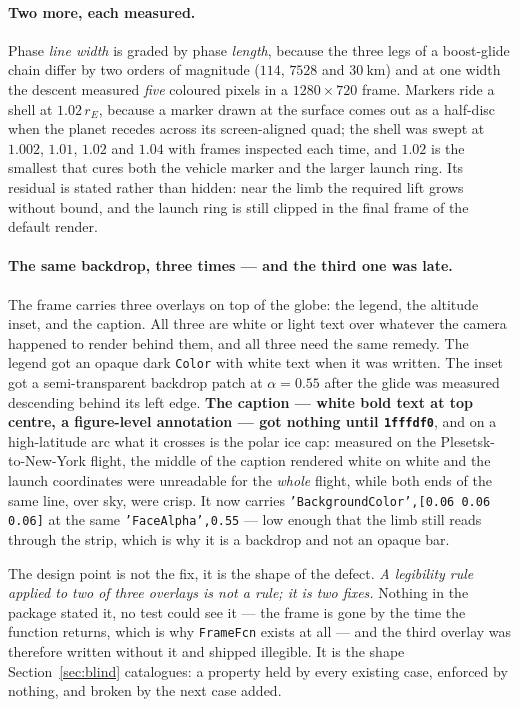 \documentclass[11pt]{article}
\newcommand{\code}[1]{\texttt{#1}}
\begin{document}
\paragraph{Two more, each measured.} Phase \emph{line width} is graded by phase
\emph{length}, because the three legs of a boost-glide chain differ by two
orders of magnitude ($114$, $7528$ and $30~\mathrm{km}$) and at one width the
descent measured \emph{five} coloured pixels in a $1280\times720$ frame.
Markers ride a shell at $1.02\,r_E$, because a marker drawn at the surface
comes out as a half-disc when the planet recedes across its screen-aligned
quad; the shell was swept at $1.002$, $1.01$, $1.02$ and $1.04$ with frames
inspected each time, and $1.02$ is the smallest that cures both the vehicle
marker and the larger launch ring. Its residual is stated rather than hidden:
near the limb the required lift grows without bound, and the launch ring is
still clipped in the final frame of the default render.

\paragraph{The same backdrop, three times --- and the third one was late.} The
frame carries three overlays on top of the globe: the legend, the altitude
inset, and the caption. All three are white or light text over whatever the
camera happened to render behind them, and all three need the same remedy. The
legend got an opaque dark \code{Color} with white text when it was written. The
inset got a semi-transparent backdrop patch at $\alpha = 0.55$ after the glide
was measured descending behind its left edge. \textbf{The caption --- white bold
text at top centre, a figure-level annotation --- got nothing until
\code{1fffdf0}}, and on a high-latitude arc what it crosses is the polar ice
cap: measured on the Plesetsk-to-New-York flight, the middle of the caption
rendered white on white and the launch coordinates were unreadable for the
\emph{whole} flight, while both ends of the same line, over sky, were crisp. It
now carries \code{'BackgroundColor',[0.06 0.06 0.06]} at the same
\code{'FaceAlpha',0.55} --- low enough that the limb still reads through the
strip, which is why it is a backdrop and not an opaque bar.

The design point is not the fix, it is the shape of the defect. \emph{A
legibility rule applied to two of three overlays is not a rule; it is two
fixes.} Nothing in the package stated it, no test could see it --- the frame is
gone by the time the function returns, which is why \code{FrameFcn} exists at
all --- and the third overlay was therefore written without it and shipped
illegible. It is the shape Section~\ref{sec:blind} catalogues: a property held
by every existing case, enforced by nothing, and broken by the next case added.
\end{document}
